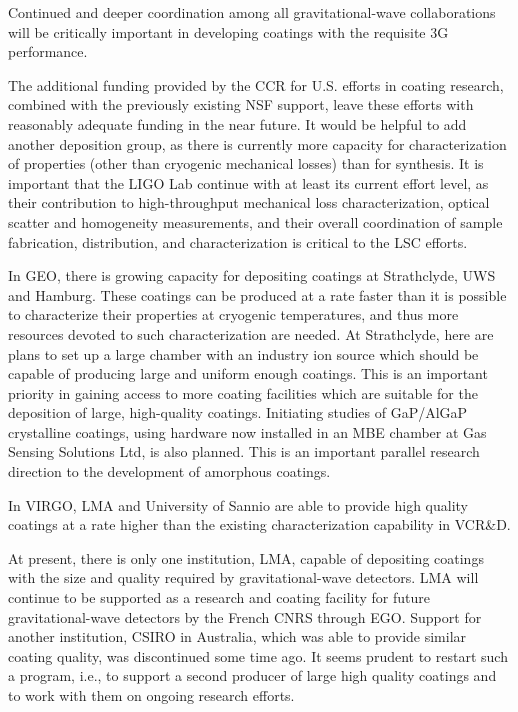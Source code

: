 Continued and deeper coordination among all gravitational-wave collaborations will be critically important in developing coatings with the requisite 3G performance.

The additional funding provided by the CCR for U.S. efforts in coating research, combined with the previously existing NSF support, leave these efforts with reasonably adequate funding in the near future. It would be helpful to add another deposition group, as there is currently more capacity for characterization of properties (other than cryogenic mechanical losses) than for synthesis. It is important that the LIGO Lab continue with at least its current effort level, as their contribution to high-throughput mechanical loss characterization, optical scatter and homogeneity measurements, and their overall coordination of sample fabrication, distribution, and characterization is critical to the LSC efforts.

In GEO, there is growing capacity for depositing coatings at Strathclyde, UWS and Hamburg. These coatings can be produced at a rate faster than it is possible to characterize their properties at cryogenic temperatures, and thus more resources devoted to such characterization are needed. 
At Strathclyde, here are plans to set up a large chamber with an industry ion source which should be capable of producing large and uniform enough coatings. This is an important priority in gaining access to more coating facilities which are suitable for the deposition of large, high-quality coatings. Initiating studies of GaP/AlGaP crystalline coatings, using hardware now installed in an MBE chamber at Gas Sensing Solutions Ltd, is also planned. This is an important parallel research direction to the development of amorphous coatings.

In VIRGO, LMA and University of Sannio are able to provide high quality coatings at a rate higher than the existing characterization capability in VCR\&D. 

At present, there is only one institution, LMA, capable of depositing coatings with the size and quality required by gravitational-wave detectors. LMA will continue to be supported as a research and coating facility for future gravitational-wave detectors by the French CNRS through EGO. Support for another institution, CSIRO in Australia, which was able to provide similar coating quality, was discontinued some time ago. It seems prudent to restart such a program, i.e., to support a second producer of large high quality coatings and to work with them on ongoing research efforts. 


